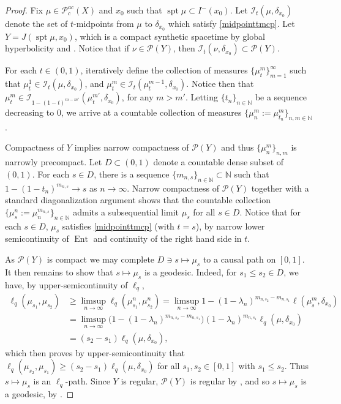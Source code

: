 \documentclass{article}
\newcommand{\N}{\mathbb{N}}
\DeclareMathOperator{\spt}{spt}
\newcommand{\Ical}{\mathcal{I}}
\newcommand{\Pcal}{\mathcal{P}}
\DeclareMathOperator{\Ent}{Ent}
\theoremstyle{definition}
\begin{document}
{\begin{proof}
Fix $\mu\in \Pcal^{ac}_c(X)$ and $x_0$ such that $\spt\mu\subset I^-(x_0)$. Let $\Ical_t(\mu, \delta_{x_0})$ denote the set of $t$-midpoints from $\mu$ to $\delta_{x_0}$ which satisfy \eqref{midpointtmcp}. Let $Y=J(\spt\mu, x_0)$, which is a compact synthetic spacetime by global hyperbolicity and . Notice that if $\nu\in \Pcal(Y)$, then $\Ical_t(\nu,\delta_{x_0})\subset \Pcal(Y)$. 

For each $t\in (0,1)$, iteratively define the collection of measures $\{\mu^m_t\}_{m=1}^\infty$ such that $\mu^1_t\in \Ical_t(\mu, \delta_{x_0})$, and $\mu^m_t\in \Ical_t(\mu_{t}^{m-1}, \delta_{x_0})$. Notice then that $\mu^m_t\in \Ical_{1-(1-t)^{m-m'}}(\mu^{m'}_t, \delta_{x_0})$, for any $m>m'$. Letting $\{t_n\}_{n\in \N}$ be a sequence decreasing to $0$, we arrive at a countable collection of measures $\{\mu^m_n:= \mu^m_{t_n}\}_{n,m\in \N}$. 

Compactness of $Y$ implies narrow compactness of $\Pcal(Y)$ and thus $\{\mu^m_n\}_{n,m}$ is narrowly precompact. Let $D\subset (0,1)$ denote a countable dense subset of $(0,1)$. For each $s\in D$, there is a sequence $\{m_{n,s}\}_{n\in\N}\subset \N$ such that $1-(1-t_n)^{m_{n,s}}\to s$ as $n\to \infty$. Narrow compactness of $\Pcal(Y)$ together with a standard diagonalization argument shows that the countable collection $\{\mu^n_s:=\mu^{m_{n,s}}_n\}_{n\in\N}$ admits a subsequential limit $\mu_{s}$ for all $s\in D$. Notice that for each $s\in D$, $\mu_s$ satisfies \eqref{midpointtmcp} (with $t=s$), by narrow lower semicontinuity of $\Ent$ and continuity of the right hand side in $t$. 

As $\Pcal(Y)$ is compact we may complete $D\ni s\mapsto \mu_s$ to a causal path on $[0,1]$. It then remains to show that  $s\mapsto \mu_s$ is a geodesic. Indeed, for $s_1\leq s_2\in D$, we have, by upper-semicontinuity of $\ell_q$, 
\begin{align*}
\ell_q(\mu_{s_1},\mu_{s_2})&\geq \limsup_{n\to\infty} \ell_q(\mu^n_{s_1}, \mu^n_{s_2})= \limsup_{n\to\infty}1-(1-\lambda_n)^{m_{n,s_2}-m_{n,s_1}}\ell(\mu_s^m,\delta_{x_0})\\
&=\limsup_{n\to\infty}\Big(1-(1-\lambda_n)^{m_{n,s_2}-m_{n,s_1}}\Big)(1-\lambda_n)^{m_{n,s_1}}\ell_q(\mu, \delta_{x_0})\\
&=(s_2-s_1) \ell_q(\mu, \delta_{x_0}),
\end{align*}
which then proves by upper-semicontinuity that $\ell_q(\mu_{s_2},\mu_{s_1})\geq (s_2-s_1)\ell_q(\mu, \delta_{x_0})$ for all $s_1,s_2\in [0,1]$ with $s_1\leq s_2$. Thus $s\mapsto \mu_s$ is an $\ell_q$-path. Since $Y$ is regular, $\Pcal(Y)$ is regular by , and so $s\mapsto \mu_s$ is a geodesic, by . 
\end{proof}


}
\end{document}
